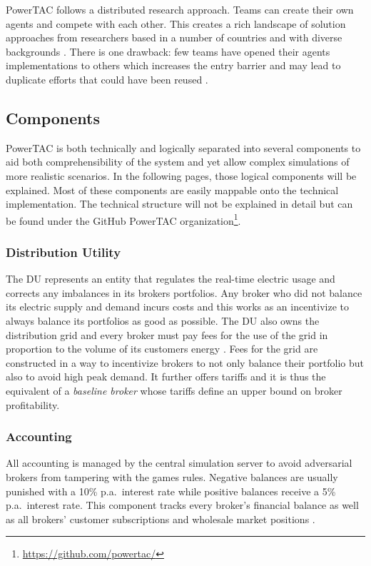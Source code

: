 \ac{PowerTAC} follows a distributed research approach. Teams can create their own agents and compete with each
other. This creates a rich landscape of solution approaches from researchers based in a number of countries and with
diverse backgrounds \cite[]{ketter2015competitive}. There is one drawback: few teams have opened their agents
implementations to others which increases the entry barrier and may lead to duplicate efforts that could have been
reused \citep{boettiger2015introduction}.

\subsection{Components}%
\label{sub:components}



\ac{PowerTAC} is both technically and logically separated into several components to aid both comprehensibility of the
system and yet allow complex simulations of more realistic scenarios. In the following pages, those logical components
will be explained. Most of these components are easily mappable onto the technical implementation. The technical
structure will not be explained in detail but can be found under the GitHub \ac{PowerTAC}
organization\footnote{\url{https://github.com/powertac/}}.


\subsubsection{Distribution Utility} The \ac{DU} represents an entity that regulates the real-time electric usage and
corrects any imbalances in its brokers portfolios. Any broker who did not balance its electric supply and demand incurs
costs and this works as an incentivize to always balance its portfolios as good as possible. The \ac{DU} also owns the
distribution grid and every broker must pay fees for the use of the grid in proportion to the volume of its customers
energy \citep[p.10]{ketter2018powertac}. Fees for the grid are constructed in a way to incentivize
brokers to not only balance their portfolio but also to avoid high peak demand. It further offers tariffs and it is
thus the equivalent of a \emph{baseline broker} whose tariffs define an upper bound on broker profitability.

\subsubsection{Accounting} All accounting is managed by the central simulation server to avoid adversarial brokers
from tampering with the games rules. Negative balances are usually punished with a 10\% p.a.\ interest rate while
positive balances receive a 5\% p.a.\ interest rate. This component tracks every broker's financial balance as well as
all brokers' customer subscriptions and wholesale market positions \citep[p.11]{ketter2018powertac}.

